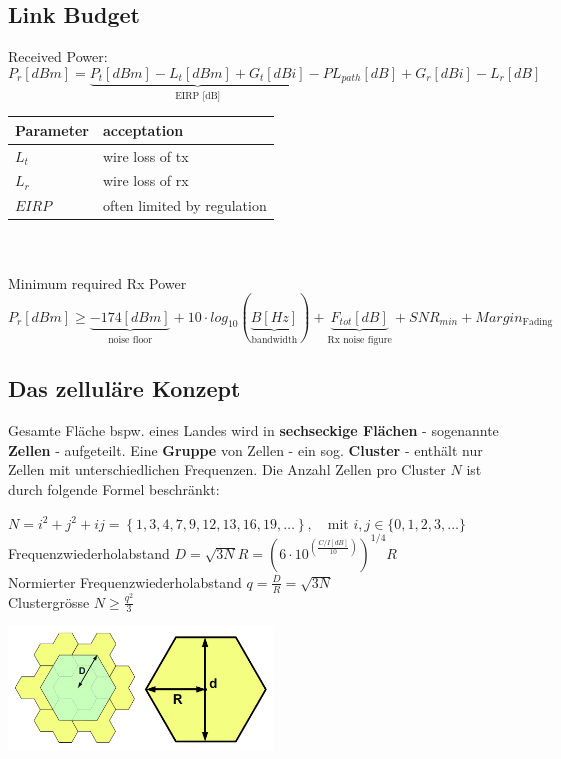 \subsection{Link Budget}
Received Power:
\begin{equation}
	P_r [dBm] = \underbrace{P_t [dBm] - L_t [dBm] + G_t[dBi]}_{ \text{EIRP [dB]} } - PL_{path}[dB] + G_r[dBi] -L_r[dB]
\end{equation}

\begin{tabular}{ll}
\textbf{Parameter} & \textbf{acceptation} \\ \hline
$L_t$ & wire loss of tx \\ 
$L_r$ & wire loss of rx \\ 
$EIRP$ & often limited by regulation \\ 
\end{tabular} \\ \\

Minimum required Rx Power
\begin{equation}
	P_r [dBm] \geq \underbrace{-174[dBm]}_{ \text{noise floor} } + 10 \cdot log_{10}(\underbrace{B [Hz]}_{\text{bandwidth} }) + 
	\underbrace{F_{tot}[dB]}_{ \text{Rx noise figure} } + SNR_{min} + Margin_{ \text{Fading} }
\end{equation}

\subsection{Das zelluläre Konzept }
	\begin{minipage}{12cm}
		Gesamte Fläche bspw. eines Landes wird in \textbf{sechseckige Flächen} - sogenannte \textbf{Zellen} - aufgeteilt. 
		Eine \textbf{Gruppe} von Zellen - ein sog. \textbf{Cluster} - enthält nur Zellen mit unterschiedlichen Frequenzen.
		Die Anzahl Zellen pro Cluster $N$ ist durch folgende Formel beschränkt:
		\begin{center}
	        $ N=i^2+j^2+ij = \left\{1,3,4,7,9,12,13,16,19,\ldots\right\}, \quad \text{mit } i,j \in
	        \{0,1,2,3,\ldots \} $ \\ Frequenzwiederholabstand $ D = \sqrt{3N} R = (6\cdot 10^(\frac{C/I[dB]}{10}))^{1/4} R$ \\ Normierter Frequenzwiederholabstand $q = \frac{D}{R} =
	        \sqrt{3N}$ \\ Clustergrösse $N \geq \frac{q^2}{3}$
        \end{center}
	\end{minipage}
	\begin{minipage}{8cm}
	    \includegraphics[width=7cm]{./bilder/systems-cluster.png}
	\end{minipage}

